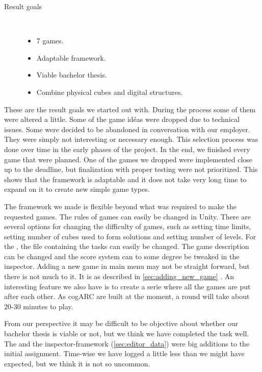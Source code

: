 \begin{description}
	\item[Result goals]\ 
	\begin{itemize}
		\item 7 games.
		\item Adaptable framework.
		\item Viable bachelor thesis.
		\item Combine physical cubes and digital structures.
	\end{itemize}
\end{description}

These are the result goals we started out with. During the process some of them
were altered a little. Some of the game id\'eas were dropped due to technical
issues. Some were decided to be abandoned in conversation with our employer.
They were simply not interesting or necessary enough. This selection process
was done over time in the early phases of the project. In the end, we finished
every game that were planned. One of the games we dropped were implemented
close up to the deadline, but finalization with proper testing were not
prioritized. This shows that the framework is adaptable and it does not take
very long time to expand on it to create new simple game types.

The framework we made is flexible beyond what was required to make the
requested games.
The rules of games can easily be changed in Unity. 
There are several options for changing the difficulty of games, such as setting time limits, setting number of cubes used to form solutions and setting number of levels.
For the \nameref{game:wo0ord_game}, the file containing the tasks can easily be changed. 
The game description can be changed and the score system can to some degree be tweaked in the inspector.
Adding a new game in main menu may not be straight forward, but there is not
much to it. It is as described in \autoref{sec:adding_new_game}
. An interesting feature we also have is to create
a serie where all the games are put after each other. As cogARC are built at
the moment, a round will take about 20-30 minutes to play.

From our perspective it may be difficult to be objective about whether our 
bachelor thesis is viable or not, but we think we have completed the task well.
The \nameref{game:wo0ord_game} and the inspector-framework
(\ref{sec:editor_data}) were big additions to the initial assignment.
Time-wise we have logged a little less than we might have expected, but we
think it is not so uncommon.

